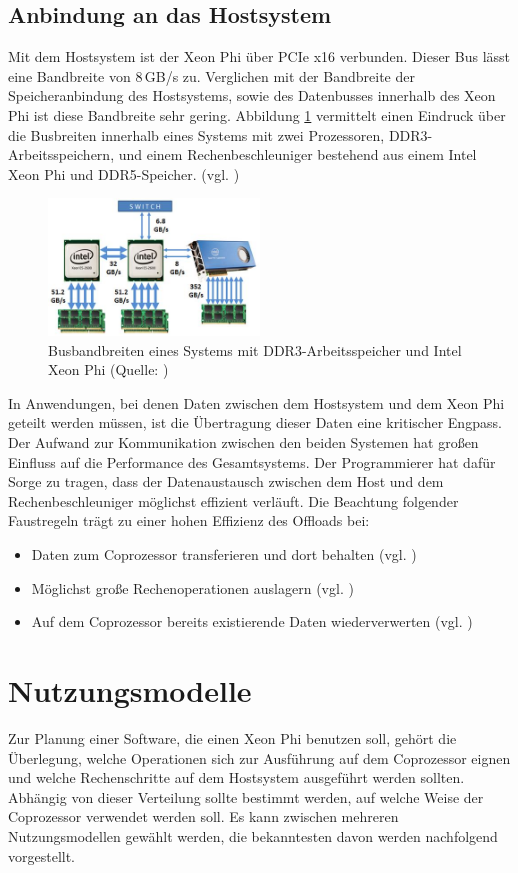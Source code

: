 \documentclass[../main.tex]{subfiles}
\begin{document}
\subsection{Anbindung an das Hostsystem}
Mit dem Hostsystem ist der Xeon Phi über PCIe x16 verbunden. Dieser Bus lässt eine Bandbreite von 8\,GB/s zu. Verglichen mit der Bandbreite der Speicheranbindung des Hostsystems, sowie des Datenbusses innerhalb des Xeon Phi ist diese Bandbreite sehr gering. Abbildung \ref{pic:xeonphiBandwidths} vermittelt einen Eindruck über die Busbreiten innerhalb eines Systems mit zwei Prozessoren, DDR3-Arbeitsspeichern, und einem Rechenbeschleuniger bestehend aus einem Intel Xeon Phi und DDR5-Speicher. (vgl. \cite{interDeviceCommunication})
\begin{figure}
    \centering 
       \includegraphics[width=0.5\textwidth]{../images/Schmidt/xeonphi_bandwidths.jpg} 
    \caption {Busbandbreiten eines Systems mit DDR3-Arbeitsspeicher und Intel Xeon Phi (Quelle: \parencite{interDeviceCommunication})}
    \label{pic:xeonphiBandwidths} 
\end{figure}
In Anwendungen, bei denen Daten zwischen dem Hostsystem und dem Xeon Phi geteilt werden müssen, ist die Übertragung dieser Daten eine kritischer Engpass. Der Aufwand zur Kommunikation zwischen den beiden Systemen hat großen Einfluss auf die Performance des Gesamtsystems. Der Programmierer hat dafür Sorge zu tragen, dass der Datenaustausch zwischen dem Host und dem Rechenbeschleuniger möglichst effizient verläuft. Die Beachtung folgender Faustregeln trägt zu einer hohen Effizienz des Offloads bei: 
\begin{itemize}
\item Daten zum Coprozessor transferieren und dort behalten (vgl. \cite{xeonphiJumpstart})
\item Möglichst große Rechenoperationen auslagern (vgl. \cite{xeonphiJumpstart})
\item Auf dem Coprozessor bereits existierende Daten wiederverwerten (vgl. \cite{xeonphiJumpstart})
\end{itemize}
\section{Nutzungsmodelle}
Zur Planung einer Software, die einen Xeon Phi benutzen soll, gehört die Überlegung, welche Operationen sich zur Ausführung auf dem Coprozessor eignen und welche Rechenschritte auf dem Hostsystem ausgeführt werden sollten. Abhängig von dieser Verteilung sollte bestimmt werden, auf welche Weise der Coprozessor verwendet werden soll. Es kann zwischen mehreren Nutzungsmodellen gewählt werden, die bekanntesten davon werden nachfolgend vorgestellt. 
\end{document}
